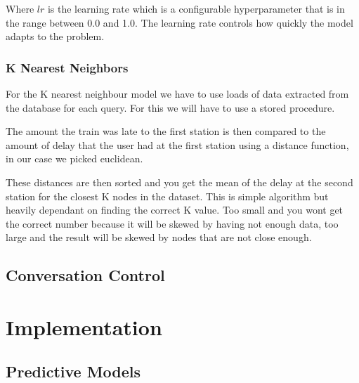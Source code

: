 \documentclass[11pt]{article}
\begin{document}
	Where $lr$ is the learning rate which is a configurable hyperparameter that is in the range between 0.0 and 1.0. The learning rate controls how quickly the model adapts to the problem.
	
	\subsubsection{K Nearest Neighbors}		
	
	For the K nearest neighbour model we have to use loads of data extracted from the database for each query. For this we will have to use a stored procedure.
	
	The amount the train was late to the first station is then compared to the amount of delay that the user had at the first station using a distance function, in our case we picked euclidean.
	
	These distances are then sorted and you get the mean of the delay at the second station for the closest K nodes in the dataset. This is simple algorithm but heavily dependant on finding the correct K value. Too small and you wont get the correct number because it will be skewed by having not enough data, too large and the result will be skewed by nodes that are not close enough.
	
	\subsection{Conversation Control}
	
	
	\section{Implementation}
	
	\subsection{Predictive Models}
	
\end{document}
